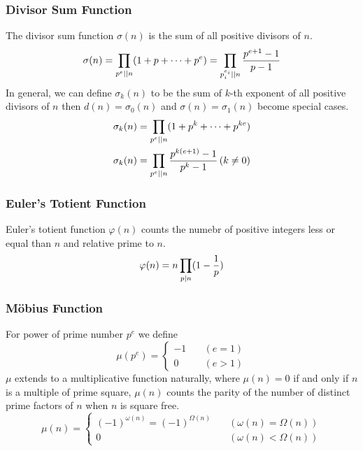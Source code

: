 \subsubsection*{Divisor Sum Function}
The divisor sum function $\sigma(n)$ is the sum of all positive divisors of $n$.
\begin{equation*}
\sigma(n) = \prod_{{p^e} \vert\vert n} (1 + p + \cdots + p^e)
= \prod_{p_i^{e_i} \vert\vert n} {p^{e + 1} - 1 \over p - 1}
\end{equation*}
In general, we can define $\sigma_k(n)$ to be the sum of $k$-th exponent of all
positive divisors of $n$ then $d(n) = \sigma_0(n)$ and $\sigma(n) = \sigma_1(n)$
become special cases.
\begin{align*}
\sigma_k(n) &= \prod_{p^e \vert\vert n} (1 + p^k + \cdots + p^{ke}) \\
\sigma_k(n) &= \prod_{p^e \vert\vert n} {p^{k(e + 1)} - 1 \over p^k - 1} \, (k \neq 0)
\end{align*}

\subsubsection*{Euler's Totient Function}
Euler's totient function $\varphi(n)$ counts the numebr of positive integers less or equal than
$n$ and relative prime to $n$.
$$\varphi(n) = n \prod_{p \vert n} (1 - {1 \over p})$$


\subsubsection*{M\"obius Function}
For power of prime number $p^e$ we define
\begin{equation*}
\mu(p^e) =
\begin{cases}
  -1 & \quad (e = 1) \\
  0  & \quad (e > 1)
\end{cases}
\end{equation*}
$\mu$ extends to a multiplicative function naturally, where $\mu(n) = 0$ if and only if $n$
is a multiple of prime square, $\mu(n)$ counts the parity of the number of distinct prime
factors of $n$ when $n$ is square free.
\begin{equation*}
\mu(n) =
\begin{cases}
  (-1)^{\omega(n)} = (-1)^{\Omega(n)} \quad & (\omega(n) = \Omega(n)) \\
  0 & (\omega(n) < \Omega(n))
\end{cases}
\end{equation*}

